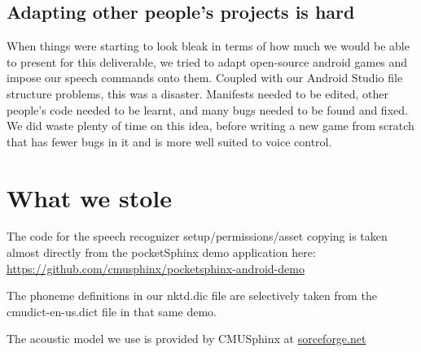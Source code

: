 \documentclass[11pt, oneside]{article}
\begin{document}
\subsection*{Adapting other people's projects is hard}

When things were starting to look bleak in terms of how much we would
be able to present for this deliverable, we tried to adapt open-source
android games and impose our speech commands onto them. Coupled with
our Android Studio file structure problems, this was a disaster.
Manifests needed to be edited, other people’s code needed to be
learnt, and many bugs needed to be found and fixed.  We did waste
plenty of time on this idea, before writing a new game from scratch
that has fewer bugs in it and is more well suited to voice control.


\section*{What we stole}

The code for the speech recognizer setup/permissions/asset copying is
taken almost directly from the pocketSphinx demo application here:
\url{https://github.com/cmusphinx/pocketsphinx-android-demo}

The phoneme definitions in our nktd.dic file are selectively taken
from the cmudict-en-us.dict file in that same demo.

The acoustic model we use is provided by CMUSphinx at
\href{https://sourceforge.net/projects/cmusphinx/files/Acoustic\%20and\%20Language\%20Models/US\%20English/}{sorceforge.net}
\end{document}
